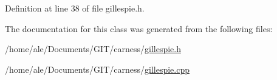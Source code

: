Definition at line 38 of file gillespie.\-h.



The documentation for this class was generated from the following files\-:\begin{DoxyCompactItemize}
\item 
/home/ale/\-Documents/\-G\-I\-T/carness/\hyperlink{a00082}{gillespie.\-h}\item 
/home/ale/\-Documents/\-G\-I\-T/carness/\hyperlink{a00081}{gillespie.\-cpp}\end{DoxyCompactItemize}
